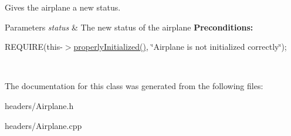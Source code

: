 Gives the airplane a new status. 


\begin{DoxyParams}{Parameters}
{\em status} & The new status of the airplane {\bfseries Preconditions\+:}
\begin{DoxyItemize}
\item R\+E\+Q\+U\+I\+RE(this-\/$>$\mbox{\hyperlink{class_airplane_a6f80df8f692cc8d67d292c1e9f26d59e}{properly\+Initialized()}}, \char`\"{}\+Airplane is not initialized correctly\char`\"{}); 
\end{DoxyItemize}\\
\hline
\end{DoxyParams}


The documentation for this class was generated from the following files\+:\begin{DoxyCompactItemize}
\item 
headers/Airplane.\+h\item 
headers/Airplane.\+cpp\end{DoxyCompactItemize}
